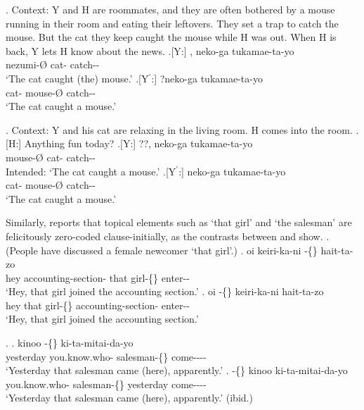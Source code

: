 \largerpage
\ex. Context: Y and H are roommates,
		and they are often bothered by a mouse running in their room
		and eating their leftovers.
	They set a trap to catch the mouse.
	But the cat they keep caught the mouse while H was out.
	When H is back, Y lets H know about the news.
	\ag.[Y:] , neko-ga tukamae-ta-yo \\
		nezumi-{\O} cat- catch-- \\
		`The cat caught (the) mouse.'
	\bg.[Y$^{\prime}$:] ?neko-ga  tukamae-ta-yo \\
		cat- mouse-{\O} catch-- \\
		`The cat caught a mouse.'

%
\ex. Context: Y and his cat are relaxing in the living room.
	H comes into the room.
	\a.[H:] Anything fun today?
	\bg.[Y:] ??, neko-ga tukamae-ta-yo \\
		mouse-{\O} cat- catch-- \\
		Intended: `The cat caught a mouse.'
	\bg.[Y$^{\prime}$:] neko-ga  tukamae-ta-yo \\
		cat- mouse-{\O} catch-- \\
		`The cat caught a mouse.'


Similarly,
 reports that topical elements such as
 `that girl' and  `the salesman' are felicitously zero-coded clause-initially,
as the contrasts between \Next[a--b] and \NNext[a--b] show.
%
\ex.\label{Par:Ex:Anoko} (People have discussed a female newcomer  `that girl'.)
 \ag. oi keiri-ka-ni  -\{\} hait-ta-zo \\
      hey accounting-section- that girl-\{\} enter--\\
      `Hey, that girl joined the accounting section.'
 \bg. oi  -\{\} keiri-ka-ni hait-ta-zo \\
      hey that girl-\{\} accounting-section- enter--\\
      `Hey, that girl joined the accounting section.'
      \hfill{\cite[293-294]{niwa06}}

\ex.\label{Par:Ex:Seerusuman}
 \ag. kinoo  -\{\} ki-ta-mitai-da-yo \\
      yesterday you.know.who- salesman-\{\} come---- \\
      `Yesterday that salesman came (here), apparently.'
 \bg.  -\{\} kinoo ki-ta-mitai-da-yo \\
      you.know.who- salesman-\{\} yesterday come---- \\
      `Yesterday that salesman came (here), apparently.'
      \hfill{(ibid.)}


